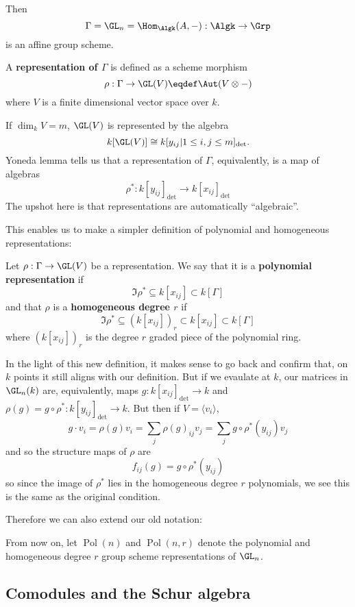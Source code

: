 \documentclass[12pt]{article}
\DeclareMathOperator{\Pol}{Pol}
\begin{document}
	Then 
	\[\Gamma=\GL_n=\Hom_{\Algk}(A,-):\Algk\to\Grp\]
	is an affine group scheme. 
	\begin{defn}
		A \textbf{representation of $\Gamma$} is defined as a scheme morphism 
		\[\rho:\Gamma\to \GL(V)\eqdef \Aut(V\otimes -)\]
		where $V$ is a finite dimensional vector space over $k$.
	\end{defn}
	\begin{rmk}
		If $\dim_k V=m$, $\GL(V)$ is represented by the algebra 
		\[k[\GL(V)]\cong k[y_{ij}|1\le i,j\le m]_{\det}.\]
		Yoneda lemma tells us that a representation of $\Gamma$, equivalently, is a map of algebras 
		\[\rho^\ast:k[y_{ij}]_{\det}\to k[x_{ij}]_{\det}\]
		The upshot here is that representations are automatically ``algebraic''.
	\end{rmk}
	This enables us to make a simpler definition of polynomial and homogeneous representations:
	\begin{defn}
		Let $\rho:\Gamma\to \GL(V)$ be a representation. We say that it is a \textbf{polynomial representation} if 
		\[\Im \rho^\ast\subseteq k[x_{ij}]\subset k[\Gamma]\]
		and that $\rho$ is a \textbf{homogeneous degree $r$} if 
		\[\Im\rho^\ast\subseteq (k[x_{ij}])_r\subset k[x_{ij}]\subset k[\Gamma]\]
		where $(k[x_{ij}])_r$ is the degree $r$ graded piece of the polynomial ring.
	\end{defn}
	In the light of this new definition, it makes sense to go back and confirm that, on $k$ points it still aligns with our 
	definition. But if we evaulate at $k$, our matrices in $\GL_n(k)$ are, equivalently, maps $g:k[x_{ij}]_{\det}\to k$ and
	$\rho(g)=g\circ\rho^\ast:k[y_{ij}]_{\det}\to k$. But then if $V=\langle v_i\rangle$,
	\[g\cdot v_i=\rho(g)v_i=\sum_j \rho(g)_{ij}v_j=\sum_j g\circ\rho^\ast(y_{ij})v_j\]
	and so the structure maps of $\rho$ are 
	\[f_{ij}(g)=g\circ\rho^\ast(y_{ij})\]
	so since the image of $\rho^\ast$ lies in the homogeneous degree $r$ polynomials, we see this is the same as the original condition.

	Therefore we can also extend our old notation:
	\begin{defn}
		From now on, let $\Pol(n)$ and $\Pol(n,r)$ denote the polynomial and homogeneous degree $r$ group scheme 
		representations of $\GL_n$.
	\end{defn}

	\subsection{Comodules and the Schur algebra}
\end{document}
